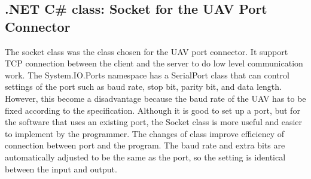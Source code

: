 \documentclass[oneside]{ecsgdp}         %
\begin{document}
\subsection{.NET C\# class: Socket for the UAV Port Connector}
The socket class was the class chosen for the UAV port connector. It support TCP connection between the client and the server to do low level communication work\cite{xiaX}. The System.IO.Ports namespace has a SerialPort class that can control settings of the port such as baud rate, stop bit, parity bit, and data length. However, this become a disadvantage because the baud rate of the UAV has to be fixed according to the specification. Although it is good to set up a port, but for the software that uses an existing port, the Socket class is more useful and easier to implement by the programmer. The changes of class improve efficiency of connection between port and the program. The baud rate and extra bits are automatically adjusted to be the same as the port, so the setting is identical between the input and output. 
\end{document}

